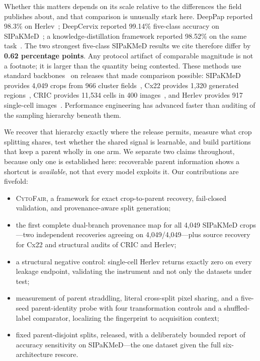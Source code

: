 \documentclass[conference]{IEEEtran}
\newcommand{\cytofair}{\textsc{CytoFair}}
\begin{document}
Whether this matters depends on its scale relative to the differences the field publishes about, and that comparison is unusually stark here.
DeepPap reported 98.3\% on Herlev~\cite{zhang2017deeppap}; DeepCervix reported 99.14\% five-class accuracy on SIPaKMeD~\cite{rahaman2021deepcervix}; a knowledge-distillation framework reported 98.52\% on the same task~\cite{gao2022knowledge}.
The two strongest five-class SIPaKMeD results we cite therefore differ by \textbf{0.62 percentage points}.
Any protocol artifact of comparable magnitude is not a footnote; it is larger than the quantity being contested.
These methods use standard backbones~\cite{he2016resnet,huang2017densenet,sandler2018mobilenetv2,tan2019efficientnet,dosovitskiy2021vit} on releases that made comparison possible: SIPaKMeD provides 4,049 crops from 966 cluster fields~\cite{plissiti2018sipakmed}, Cx22 provides 1,320 generated regions~\cite{liu2022cx22}, CRIC provides 11,534 cells in 400 images~\cite{rezende2021cric}, and Herlev provides 917 single-cell images~\cite{jantzen2005pap}.
Performance engineering has advanced faster than auditing of the sampling hierarchy beneath them.

We recover that hierarchy exactly where the release permits, measure what crop splitting shares, test whether the shared signal is learnable, and build partitions that keep a parent wholly in one arm.
We separate two claims throughout, because only one is established here: recoverable parent information shows a shortcut is \emph{available}, not that every model exploits it.
Our contributions are fivefold:
\begin{itemize}\itemsep0pt
    \item \cytofair, a framework for exact crop-to-parent recovery, fail-closed validation, and provenance-aware split generation;
    \item the first complete dual-branch provenance map for all 4,049 SIPaKMeD crops---two independent recoveries agreeing on 4,049/4,049---plus source recovery for Cx22 and structural audits of CRIC and Herlev;
    \item a structural negative control: single-cell Herlev returns exactly zero on every leakage endpoint, validating the instrument and not only the datasets under test;
    \item measurement of parent straddling, literal cross-split pixel sharing, and a five-seed parent-identity probe with four transformation controls and a shuffled-label comparator, localizing the fingerprint to acquisition context;
    \item fixed parent-disjoint splits, released, with a deliberately bounded report of accuracy sensitivity on SIPaKMeD---the one dataset given the full six-architecture rescore.
\end{itemize}
\end{document}
